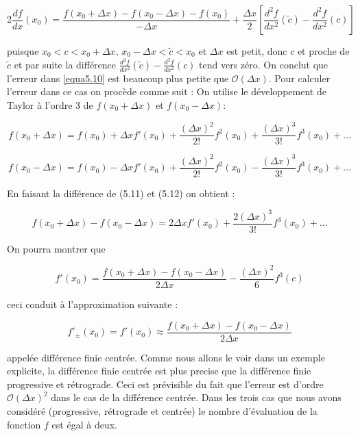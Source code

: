 \begin{equation}\label{equa5.10}
2\frac{df}{dx}(x_0) = \frac{f(x_0 + \Delta x) - f(x_0 - \Delta x) - f(x_0)}{-\Delta x} + \frac{\Delta x}{2} \left[ \frac{d^2 f}{dx^2}(\tilde{c}) - \frac{d^2 f}{dx^2}(c) \right]
\end{equation}

puisque \( x_0 < c < x_0 + \Delta x, \, x_0 - \Delta x < \tilde{c} < x_0 \) et \( \Delta x \) est petit, donc \( c \) et proche de \( \tilde{c} \) et par suite la différence \( \frac{d^2 f}{dx^2}(\tilde{c}) - \frac{d^2 f}{dx^2}(c) \) tend vers zéro. On conclut que l'erreur dans \eqref{equa5.10} est beaucoup plus petite que \( \mathcal{O}(\Delta x) \). Pour calculer l'erreur dans ce cas on procède comme suit : On utilise le développement de Taylor à l'ordre 3 de \( f(x_0 + \Delta x) \) et \( f(x_0 - \Delta x) \):

\begin{equation}\label{equa5.11}
f(x_0 + \Delta x) = f(x_0) + \Delta x f'(x_0) + \frac{(\Delta x)^2}{2!} f^2(x_0) + \frac{(\Delta x)^3}{3!} f^3(x_0) + ...
\end{equation}

\begin{equation}\label{equa5.12}
f(x_0 - \Delta x) = f(x_0) - \Delta x f'(x_0) + \frac{(\Delta x)^2}{2!} f^2(x_0) - \frac{(\Delta x)^3}{3!} f^3(x_0) + ... 
\end{equation}

En faisant la différence de (5.11) et (5.12) on obtient :

\begin{equation}\label{equa5.13}
f(x_0 + \Delta x) - f(x_0 - \Delta x) = 2\Delta x f'(x_0) + \frac{2(\Delta x)^3}{3!} f^3(x_0) + ... 
\end{equation}

On pourra montrer que

\begin{equation}\label{equa5.14}
f'(x_0) = \frac{f(x_0 + \Delta x) - f(x_0 - \Delta x)}{2\Delta x} - \frac{(\Delta x)^2}{6} f^3(c) 
\end{equation}

ceci conduit à l'approximation suivante :

\begin{equation}\label{equa5.15}
f'_{\pm}(x_0) = f'(x_0) \approx \frac{f(x_0 + \Delta x) - f(x_0 - \Delta x)}{2\Delta x} 
\end{equation}

appelée différence finie centrée. Comme nous allons le voir dans un exemple explicite, la différence finie centrée est plus precise que la différence finie progressive et rétrograde. Ceci est prévisible du fait que l'erreur est d'ordre \( \mathcal{O}(\Delta x)^2 \) dans le cas de la différence centrée. Dans les trois cas que nous avons considéré (progressive, rétrograde et centrée) le nombre d'évaluation de la fonction \( f \) est égal à deux.

